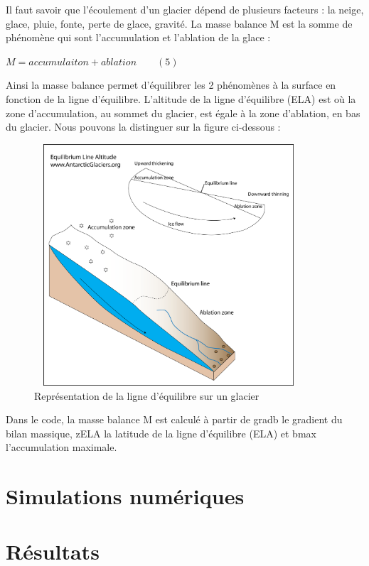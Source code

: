 \documentclass{article}
\begin{document}
\begin{itemize}[label=]
Il faut savoir que l'écoulement d'un glacier dépend de plusieurs facteurs : la neige, glace, pluie, fonte, perte de glace, gravité. La masse balance M est la somme de phénomène qui sont l'accumulation et l'ablation de la glace :
\begin{center}
$M = accumulaiton + ablation\qquad(5)$
\end{center}
Ainsi la masse balance permet d'équilibrer les 2 phénomènes à la surface en fonction de la ligne d'équilibre. L'altitude de la ligne d'équilibre (ELA) est où la zone d'accumulation, au sommet du glacier, est égale à la zone d'ablation, en bas du glacier. Nous pouvons la distinguer sur la figure ci-dessous : 
\begin{figure}
\centering
\includegraphics[width=10cm, keepaspectratio=true, height=9cm]{equilibrium_line_altitude1.png}
\caption{Représentation de la ligne d'équilibre sur un glacier}

\end{figure}

\end{itemize}

\newpage
Dans le code, la masse balance M est calculé à partir de gradb le gradient du bilan massique, zELA la latitude de la ligne d'équilibre (ELA) et bmax l'accumulation maximale.
\section{Simulations numériques}

\section{Résultats}



\end{document}
